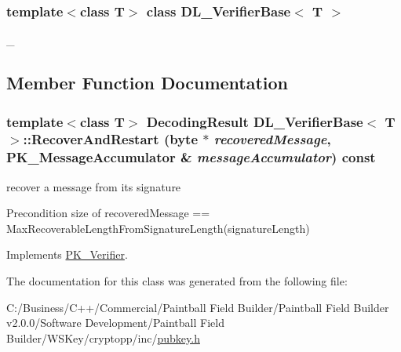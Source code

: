 \subsubsection*{template$<$class T$>$ class DL\_\-VerifierBase$<$ T $>$}

\_\- 

\subsection{Member Function Documentation}
\hypertarget{class_d_l___verifier_base_ab37d4d41fcc169d71b5b3a9d1e508270}{
\subsubsection[{RecoverAndRestart}]{\setlength{\rightskip}{0pt plus 5cm}template$<$class T$>$ {\bf DecodingResult} {\bf DL\_\-VerifierBase}$<$ T $>$::RecoverAndRestart (byte $\ast$ {\em recoveredMessage}, \/  {\bf PK\_\-MessageAccumulator} \& {\em messageAccumulator}) const}}
\label{class_d_l___verifier_base_ab37d4d41fcc169d71b5b3a9d1e508270}


recover a message from its signature \begin{DoxyPrecond}{Precondition}
size of recoveredMessage == MaxRecoverableLengthFromSignatureLength(signatureLength) 
\end{DoxyPrecond}


Implements \hyperlink{class_p_k___verifier_a6612ff44a274594890419ae75d260cce}{PK\_\-Verifier}.

The documentation for this class was generated from the following file:\begin{DoxyCompactItemize}
\item 
C:/Business/C++/Commercial/Paintball Field Builder/Paintball Field Builder v2.0.0/Software Development/Paintball Field Builder/WSKey/cryptopp/inc/\hyperlink{pubkey_8h}{pubkey.h}\end{DoxyCompactItemize}
